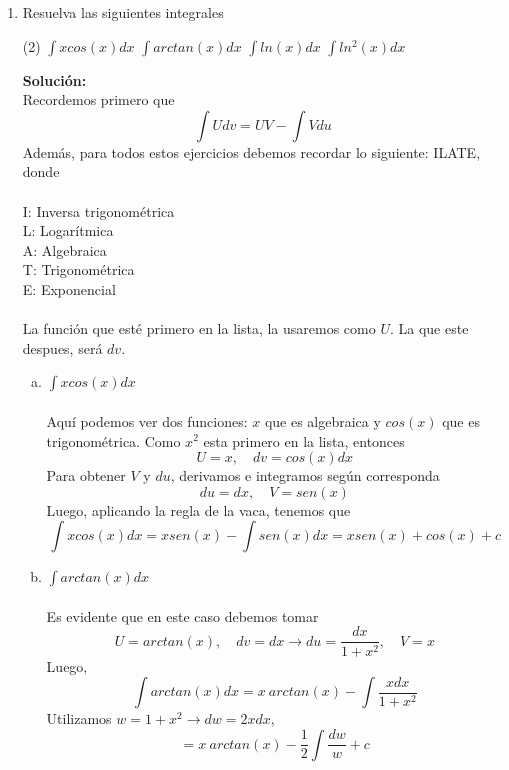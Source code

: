 \documentclass[12pt]{article}
\newenvironment{solucion}
{\begin{mdframed}[backgroundcolor=black!10]
		{\bf Solución:}\\
	}
	{
	\end{mdframed}
}
\newenvironment{preguntas}
{\begin{enumerate}\itemsep12pt
	}
	{
	\end{enumerate}
}
\newcommand{\ev}{\Big|}
\newcommand{\ra}{\rightarrow}
\begin{document}
\begin{preguntas}
\begin{solucion}
		Luego, el área de cada sección será
		$$A = \pi r_1^2 - \pi r_2^2 = \pi(x^2-x^4) $$
		Asi,
		$$dV = \pi(x^2-x^4)dx$$
		Finalmente, el volumen del sólido es
		$$V = \int_0^1 \pi(x^2-x^4)dx = \pi\left(\dfrac{x^3}{3} - \dfrac{x^5}{5}\right)\ev_0^1 = \pi \left(\dfrac{1}{3}-\dfrac{1}{5}\right) = \dfrac{2\pi}{15}$$
\end{solucion}
\item Resuelva las siguientes integrales
\begin{tasks}(2)
\task $\displaystyle\int xcos(x)dx$
\task $\displaystyle\int arctan(x)dx$
\task $\displaystyle\int ln(x)dx$
\task $\displaystyle\int ln^2(x)dx$
\end{tasks}
\begin{solucion}
Recordemos primero que
		$$\displaystyle\int Udv = UV - \displaystyle\int Vdu$$
		Además, para todos estos ejercicios debemos recordar lo siguiente: ILATE,
		donde\\\\
		I: Inversa trigonométrica\\
		L: Logarítmica\\
		A: Algebraica\\
		T: Trigonométrica\\
		E: Exponencial\\\\
		La función que esté primero en la lista, la usaremos como $U$. La que este despues, será $dv$.
\begin{enumerate}[a)]
\item $\displaystyle\int xcos(x)dx$\\\\
			Aquí podemos ver dos funciones: $x$ que es algebraica y $cos(x)$ que es trigonométrica. Como $x^2$ esta primero en la lista, entonces
			$$U = x, \quad dv = cos(x)dx$$
			Para obtener $V$ y $du$, derivamos e integramos según corresponda
			$$du = dx, \quad V = sen(x)$$
			Luego, aplicando la regla de la vaca, tenemos que
			$$\displaystyle\int xcos(x)dx = xsen(x) - \displaystyle\int sen(x)dx = xsen(x) +cos(x) + c $$
\item $\displaystyle\int arctan(x)dx$\\\\
			Es evidente que en este caso debemos tomar
			$$U = arctan(x), \quad dv = dx \ra du = \dfrac{dx}{1+x^2}, \quad V = x$$
			Luego,
			$$\displaystyle\int arctan(x)dx 
			= x\ arctan(x) - \displaystyle\int \dfrac{xdx}{1+x^2} $$
			Utilizamos $w = 1+x^2 \ra dw = 2xdx$, 
			$$= x\ arctan(x) - \dfrac{1}{2}\displaystyle\int \dfrac{dw}{w} + c
$$
\end{enumerate}
\end{solucion}
\end{preguntas}
\end{document}
